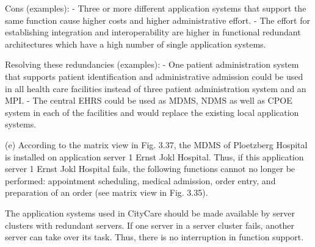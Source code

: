 Cons (examples):
- Three or more different application systems that support the same function cause higher costs and higher administrative effort.
- The effort for establishing integration and interoperability are higher in functional redundant architectures which have a high number of single application systems.

Resolving these redundancies (examples):
- One patient administration system that supports patient identification and administrative admission could be used in all health care facilities instead of three patient administration system and an MPI.
- The central EHRS could be used as MDMS, NDMS as well as CPOE system in each of the facilities and would replace the existing local application systems.

(e) According to the matrix view in Fig. 3.37, the MDMS of Ploetzberg Hospital is installed on application server 1 Ernst Jokl Hospital. Thus, if this application server 1 Ernst Jokl Hospital fails, the following functions cannot no longer be performed: appointment scheduling, medical admission, order entry, and preparation of an order (see matrix view in Fig. 3.35).

The application systems used in CityCare should be made available by server clusters with redundant servers. If one server in a server cluster fails, another server can take over its task. Thus, there is no interruption in function support.
 
